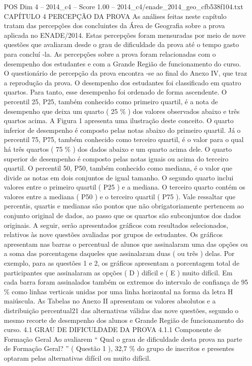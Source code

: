 \begin{textsample}{POS Dim 4 – 2014\_c4 – Score 1.00 – 2014\_c4/enade\_2014\_geo\_cfb538f104.txt}  \label{ex:f4_pos_204}
CAPÍTULO 4 PERCEPÇÃO DA PROVA As análises feitas neste capítulo tratam das percepções dos concluintes da Área de Geografia sobre a prova aplicada no ENADE/2014.
Estas percepções foram mensuradas por meio de nove questões que avaliaram desde o grau de dificuldade da prova até o tempo gasto para concluí -la.
As percepções sobre a prova foram relacionadas com o desempenho dos estudantes e com a Grande Região de funcionamento do curso.
O questionário de percepção da prova encontra -se ao final do Anexo IV, que traz a reprodução da prova.
O desempenho dos estudantes foi classificado em quatro quartos.
Para tanto, esse desempenho foi ordenado de forma ascendente.
O percentil 25, P25, também conhecido como primeiro quartil, é a nota de desempenho que deixa um quarto ( 25 \% ) dos valores observados abaixo e três quartos acima.
A Figura 1 apresenta uma ilustração deste conceito.
O quarto inferior de desempenho é composto pelas notas abaixo do primeiro quartil.
Já o percentil 75, P75, também conhecido como terceiro quartil, é o valor para o qual há três quartos ( 75 \% ) dos dados abaixo e um quarto acima dele.
O quarto superior de desempenho é composto pelas notas iguais ou acima do terceiro quartil.
O percentil 50, P50, também conhecido como mediana, é o valor que divide as notas em dois conjuntos de igual tamanho.
O segundo quarto inclui valores entre o primeiro quartil ( P25 ) e a mediana.
O terceiro quarto contém os valores entre a mediana ( P50 ) e o terceiro quartil ( P75 ).
Vale ressaltar que percentis, quartis e medianas são pontos que não obrigatoriamente pertencem ao conjunto original de dados, ao passo que os quartos são subconjuntos dos dados originais.
A seguir, serão apresentados gráficos com resultados selecionados, relativos às nove questões avaliadas por grupos de estudantes.
Os gráficos apresentam nas barras o percentual de alunos que assinalaram uma das opções ou a soma das porcentagens daqueles que assinalaram duas ( ou três ) delas.
Por exemplo, para as questões 1 e 2, os gráficos apresentam a porcentagem total de participantes que assinalaram as opções ( D ) difícil e ( E ) muito difícil.
Em cada barra foram assinalados também os extremos do intervalo de confiança de 95 \% como linhas verticais unidas por uma linha horizontal na forma da letra H maiúscula.
As Tabelas no Anexo II apresentam os valores absolutos e a distribuição percentual21 das alternativas válidas das nove questões, segundo o mesmo recorte de desempenho dos alunos e Grande Região de funcionamento do curso. 4.1 GRAU DE DIFICULDADE DA PROVA 4.1.1 Componente de Formação Geral Ao avaliarem “ Qual o grau de dificuldade desta prova na parte de Formação Geral? ” ( Questão 1 ), 32,7 \% do grupo de inscritos e presentes optaram pelas alternativas difícil ou muito difícil.

\end{textsample}
